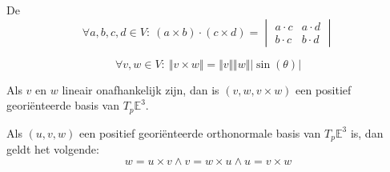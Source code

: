 \documentclass[main.tex]{subfiles}
\begin{document}
\begin{st}
  De \\
  \[
  \forall a,b,c,d \in V:\ (a\times b) \cdot (c \times d) =
  \begin{vmatrix}
    a \cdot c & a \cdot d\\
    b \cdot c & b \cdot d
  \end{vmatrix}
  \]
\end{st}

\begin{st}
  \[ \forall v,w \in V:\ \Vert v \times w\Vert = \Vert v \Vert \Vert w \Vert |\sin(\theta)| \]
\end{st}

\begin{st}
  Als $v$ en $w$ lineair onafhankelijk zijn, dan is $(v,w,v\times w)$ een positief geori\"enteerde basis van $T_{p}\mathbb{E}^{3}$.
\end{st}

\begin{st}
  Als $(u,v,w)$ een positief geori\"enteerde orthonormale basis van $T_{p}\mathbb{E}^{3}$ is, dan geldt het volgende:
  \[ w = u \times v \wedge v = w \times u \wedge u = v \times w \]
\end{st}
\end{document}
